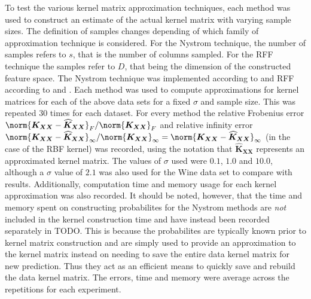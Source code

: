 To test the various kernel matrix approximation techniques, each method was used to construct an estimate of the actual kernel matrix with varying sample sizes. The definition of samples changes depending of which family of approximation technique is considered. For the Nystrom technique, the number of samples refers to $s$, that is the number of columns sampled. For the RFF technique the samples refer to $D$, that being the dimension of the constructed feature space. The Nystrom technique was implemented according to \cite{JMLR:v6:drineas05a} and RFF according to \cite{NIPS2007_013a006f} and \cite{LiuFanghui2021RFfK}. Each method was used to compute approximations for kernel matrices for each of the above data sets for a fixed $\sigma$ and sample size. This was repeated 30 times for each dataset. For every method the relative Frobenius error $\norm{\bm{K_{XX}} - \widehat{\bm{K}}_{\bm{XX}}}_{F} / \norm{\bm{K_{XX}}}_{F}$ and relative infinity error $\norm{\bm{K_{XX}} - \widehat{\bm{K}}_{\bm{XX}}}_{\infty} / \norm{\bm{K_{XX}}}_{\infty} = \norm{\bm{K_{XX}} - \widehat{\bm{K}}_{\bm{XX}}}_{\infty}$ (in the case of the RBF kernel) was recorded, using the notation that $\widehat{\bm{K}}_{\bm{XX}}$ represents an approximated kernel matrix. The values of $\sigma$ used were $0.1$, $1.0$ and $10.0$, although a $\sigma$ value of $2.1$ was also used for the Wine data set to compare with \cite{JMLR:v6:drineas05a} results. Additionally, computation time and memory usage for each kernel approximation was also recorded. It should be noted, however, that the time and memory spent on constructing probabilites for the Nystrom methods are {\it not} included in the kernel construction time and have instead been recorded separately in TODO. This is because the probabilites are typically known prior to kernel matrix construction and are simply used to provide an approximation to the kernel matrix instead on needing to save the entire data kernel matrix for new prediction. Thus they act as an efficient means to quickly save and rebuild the data kernel matrix. The errors, time and memory were average across the repetitions for each experiment.

